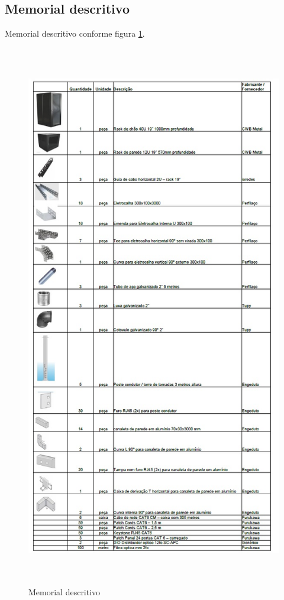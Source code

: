 \documentclass[	DIV=calc,%
							paper=a4,%
							fontsize=12pt,%
							onecolumn]{scrartcl}	 					%
\begin{document}
\subsection{Memorial descritivo}
Memorial descritivo conforme figura \ref{figura7}.  
\begin{figure}[H]
	\centering
	\includegraphics[width=\textwidth,height=24cm]{figura7}
	\caption{Memorial descritivo}
	\label{figura7}
\end{figure}
\end{document}
